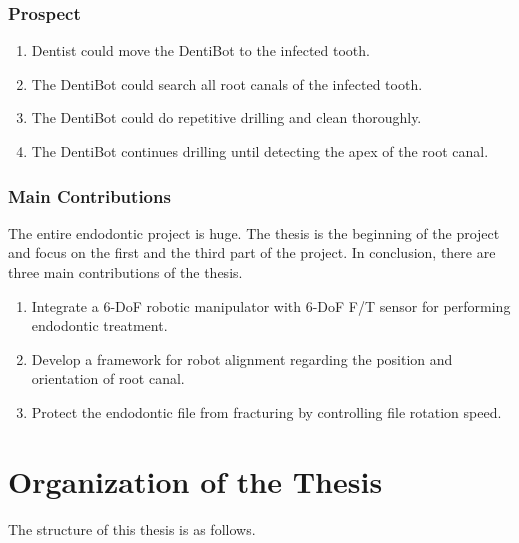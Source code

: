 \subsubsection{Prospect}
\begin{enumerate}
	\item Dentist could move the DentiBot to the infected tooth. 
	\item The DentiBot could search all root canals of the infected tooth.
	\item The DentiBot could do repetitive drilling and clean thoroughly.
	\item The DentiBot continues drilling until detecting the apex of the root canal.
\end{enumerate}	
\subsubsection{Main Contributions}
\hspace*{6mm}The entire endodontic project is huge. The thesis is the beginning of the project and focus on the first and the third part of the project. In conclusion, there are three main contributions of the thesis.
\begin{enumerate}
	\item	Integrate a 6-DoF robotic manipulator with 6-DoF F/T sensor for performing endodontic treatment.
	\item	Develop a framework for robot alignment regarding the position and orientation of root canal. 
	\item	Protect the endodontic file from fracturing by controlling file rotation speed.
\end{enumerate}
\section{Organization of the Thesis}
\hspace*{6mm}The structure of this thesis is as follows.
